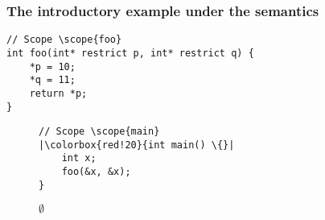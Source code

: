 \begin{frame}[fragile]
\frametitle{The introductory example under the \cinkrestrict semantics}
\begin{verbatim}
// Scope \scope{foo}
int foo(int* restrict p, int* restrict q) {   
    *p = 10;
    *q = 11;
    return *p;
}
\end{verbatim}

\begin{figure}[h]
\centering
\begin{minipage}{.33\textwidth}
\begin{verbatim}
// Scope \scope{main}
|\colorbox{red!20}{int main() \{}|
    int x;
    foo(&x, &x);
}
\end{verbatim}
\end{minipage}%
\begin{minipage}{.67\textwidth}
\executionannotation
{
    $\emptyset$
}
{
}
\end{minipage}
\end{figure}

\end{frame}



